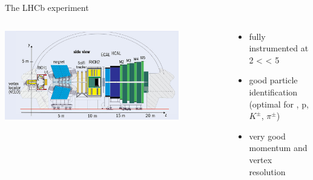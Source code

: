 \documentclass[aspectratio=1610, 9pt]{beamer}
\begin{document}
\begin{frame}{The LHCb experiment}
  \begin{columns}
    \begin{column}[c]{0.48\textwidth}
      \includegraphics[width=0.8\textwidth]{lhcb_side.jpg}
    \end{column}
    \begin{column}[c]{0.48\textwidth}
      \begin{itemize}
        \item fully instrumented at 2 < \eta < 5
        \item good particle identification (optimal for \mu, p, $K^{\pm}$, $\pi^{\pm}$)
        \item very good momentum and vertex resolution
      \end{itemize}
    \end{column}
  \end{columns}
\end{frame}
\end{document}
